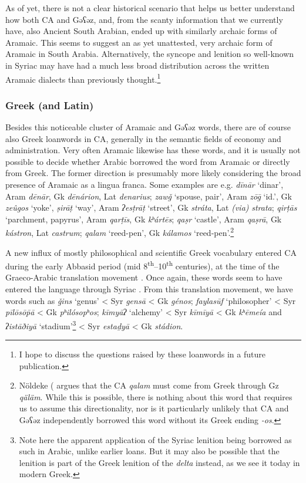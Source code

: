 \documentclass[output=paper]{langsci/langscibook}
\begin{document}
As of yet, there is not a clear historical scenario that helps us better understand how both CA and Gəʕəz, and, from the scanty information that we currently have, also Ancient South Arabian, ended up with similarly archaic forms of Aramaic. This seems to suggest an as yet unattested, very archaic form of Aramaic in South Arabia. Alternatively, the syncope and lenition so well-known in Syriac may have had a much less broad distribution across the written Aramaic dialects than previously thought.\footnote{I hope to discuss the questions raised by these loanwords in a future publication.}

\subsubsection{\label{bkm:Ref13224479}Greek (and Latin)}

Besides this noticeable cluster of Aramaic and Gəʕəz words, there are of course also Greek loanwords in CA, generally in the semantic fields of economy and administration. Very often Aramaic likewise has these words, and it is usually not possible to decide whether Arabic borrowed the word from Aramaic or directly from Greek. The former direction is presumably more likely considering the broad presence of Aramaic as a lingua franca. Some examples are e.g. \textit{dīnār} ‘dinar’, Aram \textit{dēnār}, Gk \textit{dēnárion}, Lat \textit{denarius}; \textit{zawǧ} ‘spouse, pair’, Aram \textit{zōḡ} ‘id.’, Gk \textit{zeûgos} ‘yoke’, \textit{ṣirāṭ} ‘way’, Aram \textit{ʔesṭrāṭ} ‘street’, Gk \textit{stráta}, Lat \textit{(via)} \textit{strata}; \textit{qirṭās} ‘parchment, papyrus’, Aram \textit{qarṭīs}, Gk \textit{kʰártēs}; \textit{qaṣr} ‘castle’, Aram \textit{qaṣrā}, Gk \textit{kástron}, Lat \textit{castrum}; \textit{qalam} ‘reed-pen’, Gk \textit{kálamos} ‘reed-pen’.\footnote{Nöldeke (\citeyear[50]{Nöldeke1910} argues that the CA \textit{qalam} must come from Greek through Gz \textit{qäläm}. While this is possible, there is nothing about this word that requires us to assume this directionality, nor is it particularly unlikely that CA and Gəʕəz independently borrowed this word without its Greek ending \textit{-os}.}

A new influx of mostly philosophical and scientific Greek vocabulary entered CA during the early Abbasid period (mid 8\textsuperscript{th}–10\textsuperscript{th} centuries), at the time of the Graeco-Arabic translation movement \citep{Gutas1998}. Once again, these words seem to have entered the language through Syriac \citep{Gutas2011}. From this translation movement, we have words such as \textit{ǧins} ‘genus’ < Syr \textit{gensā} < Gk \textit{génos}; \textit{faylasūf} ‘philosopher’ < Syr \textit{pīlōsō\={p}ā} < Gk \textit{pʰilósopʰos}; \textit{kīmyāʔ} ‘alchemy’ < Syr \textit{kīmīyā} < Gk \textit{kʰēmeía} and \textit{ʔistāðiyā} ‘stadium’\footnote{Note here the apparent application of the Syriac lenition being borrowed as such in Arabic, unlike earlier loans. But it may also be possible that the lenition is part of the Greek lenition of the \textit{delta} instead, as we see it today in modern Greek.} < Syr \textit{estaḏyā} < Gk \textit{stádion}.
\end{document}
